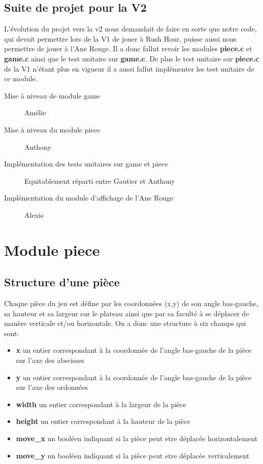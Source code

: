 \documentclass{report}
\begin{document}
\subsection*{Suite de projet pour la V2}
L'évolution du projet vers la v2 nous demandait de faire en sorte que notre code, qui devait permettre lors de la V1 de jouer à Rush Hour, puisse aussi nous permettre de jouer à l'Ane Rouge. Il a donc fallut revoir les modules \textbf{piece.c} et \textbf{game.c} ainsi que le test unitaire sur \textbf{game.c}. De plus le test unitaire sur \textbf{piece.c} de la V1 n'étant plus en vigueur il a aussi fallut implémenter les test unitaire de ce module.
\begin{description}
\item [Mise à niveau de module game] Amélie
\item [Mise à niveau du module piece] Anthony
\item [Implémentation des tests unitaires sur game et piece] Equitablement réparti entre Gautier et Anthony
\item [Implémentation du module d'affichage de l'Ane Rouge] Alexis
\end{description}

\section*{Module piece}
\subsection*{Structure d'une pièce}
Chaque pièce du jeu est défine par les coordonnées (x,y) de son angle bas-gauche, sa hauteur et sa largeur sur le plateau ainsi que par sa faculté à se déplacer de manère verticale et/ou horizontale.
On a donc une structure à six champs qui sont:
\begin{itemize}
\item \textbf{x} un entier correspondant à la coordonnée de l'angle bas-gauche de la pièce sur l'axe des abscisses
\item \textbf{y} un entier correspondant à la coordonnée de l'angle bas-gauche de la pièce sur l'axe des ordonnées
\item \textbf{width} un entier correspondant à la largeur de la pièce
\item \textbf{height} un entier correspondant à la hauteur de la pièce
\item \textbf{move\_x} un booléen indiquant si la pièce peut etre déplacée horizontalement
\item \textbf{move\_y} un booléen indiquant si la pièce peut etre déplacée verticalement
\end{itemize} 
\end{document}
